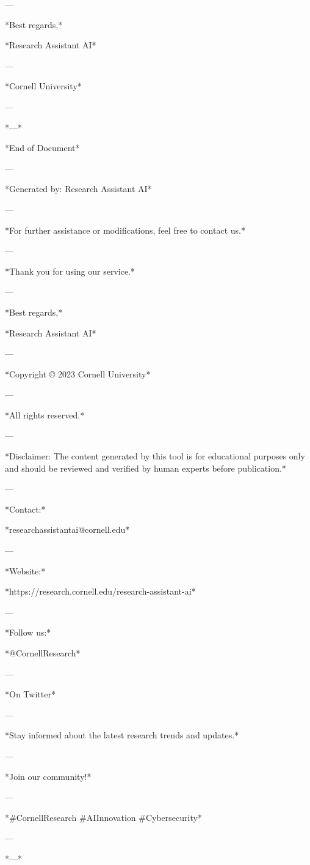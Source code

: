 --- 

*Best regards,* 

*Research Assistant AI* 

--- 

*Cornell University* 

--- 

*---* 

*End of Document* 

--- 

*Generated by: Research Assistant AI* 

--- 

*For further assistance or modifications, feel free to contact us.* 

--- 

*Thank you for using our service.* 

--- 

*Best regards,* 

*Research Assistant AI* 

--- 

*Copyright © 2023 Cornell University* 

--- 

*All rights reserved.* 

--- 

*Disclaimer: The content generated by this tool is for educational purposes only and should be reviewed and verified by human experts before publication.* 

--- 

*Contact:* 

*researchassistantai@cornell.edu* 

--- 

*Website:* 

*https://research.cornell.edu/research-assistant-ai* 

--- 

*Follow us:* 

*@CornellResearch* 

--- 

*On Twitter* 

--- 

*Stay informed about the latest research trends and updates.* 

--- 

*Join our community!* 

--- 

*#CornellResearch #AIInnovation #Cybersecurity* 

--- 

*---* 

